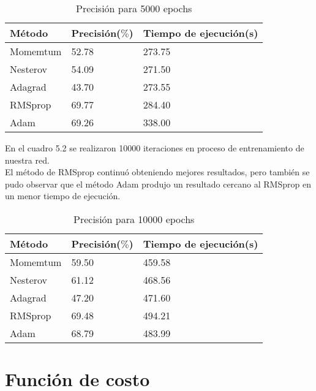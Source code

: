 \begin{table}[H]
	\centering
	\caption{Precisión para 5000 epochs}
	\label{my-label}
	\begin{centering}
	\begin{tabular}{@{}lll@{}}
		\toprule
		Método& Precisión($\%$)&  Tiempo de ejecución(s)  \\ \midrule
		Momemtum& 52.78  & 273.75 \\
		Nesterov& 54.09  &  271.50\\
		Adagrad& 43.70 &  273.55 \\
		RMSprop& 69.77 & 284.40  \\
		Adam& 69.26  & 338.00 \\ \bottomrule
	\end{tabular}
	\end{centering}

\end{table}
En el cuadro 5.2 se realizaron 10000 iteraciones en proceso de entrenamiento de nuestra red.\\ El método de RMSprop continuó obteniendo mejores resultados, pero también se pudo observar que el método Adam produjo un resultado cercano al RMSprop en un menor tiempo de ejecución.
\begin{table}[H]
	\centering
	\caption{Precisión para 10000 epochs}
	\label{my-label}
	\begin{centering}
		\begin{tabular}{@{}lll@{}}
			\toprule
			Método& Precisión($\%$)&  Tiempo de ejecución(s)  \\ \midrule
			Momemtum& 59.50  & 459.58\\
			Nesterov& 61.12 &  468.56\\
			Adagrad&47.20  &  471.60 \\
			RMSprop& 69.48 &  494.21 \\
			Adam& 68.79 & 483.99 \\ \bottomrule
		\end{tabular}
	\end{centering}
	
\end{table}

\section{Función de costo}

